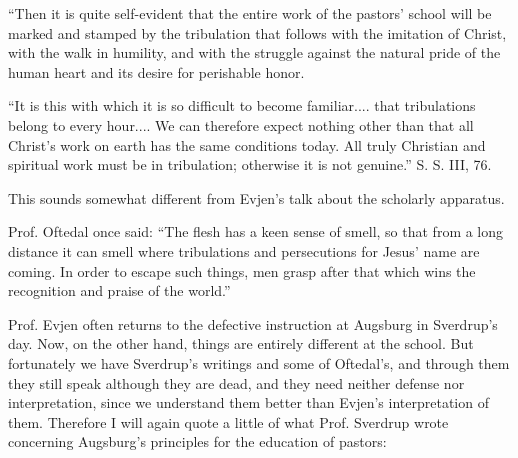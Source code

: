 “Then it is quite self-evident that the entire work of the pastors’ school will be marked and stamped by the tribulation that follows with the imitation of Christ, with the walk in humility, and with the struggle against the natural pride of the human heart and its desire for perishable honor.

“It is this with which it is so difficult to become familiar.... that tribulations belong to every hour.... We can therefore expect nothing other than that all Christ’s work on earth has the same conditions today. All truly Christian and spiritual work must be in tribulation; otherwise it is not genuine.” S. S. III, 76.

This sounds somewhat different from Evjen’s talk about the scholarly apparatus.

Prof. Oftedal once said: “The flesh has a keen sense of smell, so that from a long distance it can smell where tribulations and persecutions for Jesus’ name are coming. In order to escape such things, men grasp after that which wins the recognition and praise of the world.”

Prof. Evjen often returns to the defective instruction at Augsburg in Sverdrup’s day. Now, on the other hand, things are entirely different at the school. But fortunately we have Sverdrup’s writings and some of Oftedal’s, and through them they still speak although they are dead, and they need neither defense nor interpretation, since we understand them better than Evjen’s interpretation of them. Therefore I will again quote a little of what Prof. Sverdrup wrote concerning Augsburg’s principles for the education of pastors:

